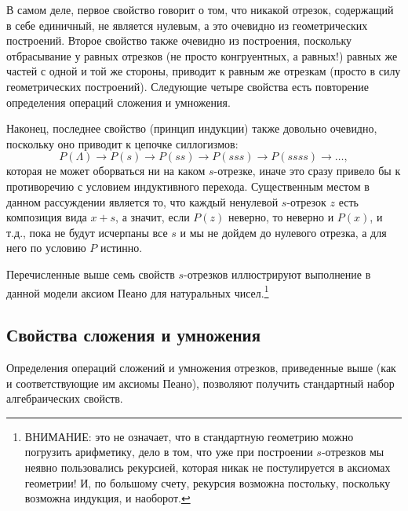 В самом деле, первое свойство говорит о том, что никакой отрезок, содержащий в себе единичный, не является нулевым, а это очевидно из геометрических построений. Второе свойство также очевидно из построения, поскольку отбрасывание у равных отрезков (не просто конгруентных, а равных!) равных же частей с одной и той же стороны, приводит к равным же отрезкам (просто в силу геометрических построений). Следующие четыре свойства есть повторение определения операций сложения и умножения.

Наконец, последнее свойство (принцип индукции) также довольно очевидно, поскольку оно приводит к цепочке силлогизмов:
$$
P(\Lambda)\to P(s)\to P(ss)\to P(sss)\to P(ssss)\to\dots,
$$
которая не может оборваться ни на каком $s$-отрезке, иначе это сразу привело бы к противоречию с условием индуктивного перехода. Существенным местом в данном рассуждении является то, что каждый ненулевой $s$-отрезок $z$ есть композиция вида $x+s$, а значит, если $P(z)$ неверно, то неверно и $P(x)$, и т.д., пока не будут исчерпаны все $s$ и мы не дойдем до нулевого отрезка, а для него по условию $P$ истинно.

Перечисленные выше семь свойств $s$-отрезков иллюстрируют выполнение в данной модели аксиом Пеано для натуральных чисел.\footnote{ВНИМАНИЕ: это не означает, что в стандартную геометрию можно погрузить арифметику, дело в том, что уже при построении $s$-отрезков мы неявно пользовались рекурсией, которая никак не постулируется в аксиомах геометрии! И, по большому счету, рекурсия возможна постольку, поскольку возможна индукция, и наоборот.}



\subsection{Свойства сложения и умножения}

Определения операций сложений и умножения отрезков, приведенные выше (как и соответствующие им аксиомы Пеано), позволяют получить стандартный набор алгебраических свойств.

